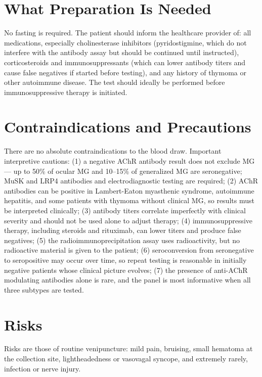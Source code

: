 \section*{What Preparation Is Needed}
No fasting is required. The patient should inform the healthcare provider of: all medications, especially cholinesterase inhibitors (pyridostigmine, which do not interfere with the antibody assay but should be continued until instructed), corticosteroids and immunosuppressants (which can lower antibody titers and cause false negatives if started before testing), and any history of thymoma or other autoimmune disease. The test should ideally be performed before immunosuppressive therapy is initiated.

\section*{Contraindications and Precautions}
There are no absolute contraindications to the blood draw. Important interpretive cautions: (1) a negative AChR antibody result does not exclude MG --- up to 50\% of ocular MG and 10--15\% of generalized MG are seronegative; MuSK and LRP4 antibodies and electrodiagnostic testing are required; (2) AChR antibodies can be positive in Lambert-Eaton myasthenic syndrome, autoimmune hepatitis, and some patients with thymoma without clinical MG, so results must be interpreted clinically; (3) antibody titers correlate imperfectly with clinical severity and should not be used alone to adjust therapy; (4) immunosuppressive therapy, including steroids and rituximab, can lower titers and produce false negatives; (5) the radioimmunoprecipitation assay uses radioactivity, but no radioactive material is given to the patient; (6) seroconversion from seronegative to seropositive may occur over time, so repeat testing is reasonable in initially negative patients whose clinical picture evolves; (7) the presence of anti-AChR modulating antibodies alone is rare, and the panel is most informative when all three subtypes are tested.

\section*{Risks}
Risks are those of routine venipuncture: mild pain, bruising, small hematoma at the collection site, lightheadedness or vasovagal syncope, and extremely rarely, infection or nerve injury.


